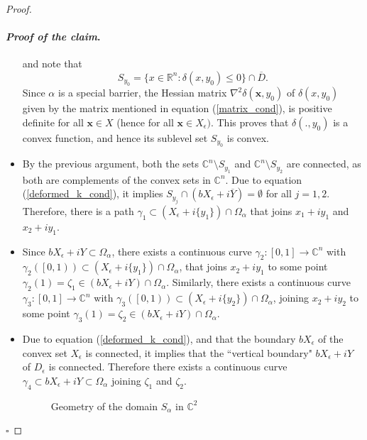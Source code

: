 \documentclass[12pt,reqno, a4paper]{amsart}
\theoremstyle{definition}
\newenvironment{claimproof}{\paragraph{\textit{Proof of the claim}.}}{\hfill$\square$}
\theoremstyle{definition}
\numberwithin{equation}{section}
\def\R{\mathbb{R}}                              %
\def\C{\mathbb{C}}                              %
\def\eps{\epsilon}
\begin{document}
\begin{proof}
\begin{claimproof}
\begin{itemize}
and note that $$S_{y_0}=\{x\in \R^n: \delta(x,y_0)\leq0\}\cap \overline{D}.$$
Since $\alpha $ is a special barrier, the Hessian matrix $\nabla^2\delta(\textbf{x},y_0)$ of $\delta(x,y_0)$ given by the matrix mentioned in equation (\ref{matrix_cond}), is positive definite for all $\textbf{x} \in X$ (hence for all $\textbf{x}\in X_{\eps}).$  This proves that $\delta(.,y_0)$ is a convex function, and hence its sublevel set $S_{y_0}$ is convex.\\
	
\item[(ii)]  By the previous argument, both the sets $\C^n\setminus S_{y_1}$ and $\C^n\setminus S_{y_2}$ are connected, as both are complements of the convex sets in $\C^n$. Due to equation (\ref{deformed_k_cond}), it implies $S_{y_j}\cap (bX_{\epsilon}+i\overline{Y})=\emptyset$ for all $j=1,2.$  Therefore, there is a path $\gamma_{1}\subset (X_{\eps}+i\{y_1\})\cap \Omega_{\alpha}$ that joins $x_1+iy_1$ and $x_2+iy_1$. \\


\item[(iii)] Since $bX_{\eps}+iY\subset \Omega_{\alpha}$, there exists a continuous curve $\gamma_{2}:[0,1]\to \C^n$ with $\gamma_{2}(\left[0,1\right))\subset ({X_{\eps}}+i\{y_1\})\cap \Omega_{\alpha}$, that joins $x_2+iy_1$ to some point $\gamma_{2}(1)=\zeta_1\in (bX_{\epsilon}+iY)\cap {\Omega_{\alpha}}$. Similarly, there exists a continuous curve $\gamma_{3}:[0,1]\to \C^n$ with $\gamma_{3}(\left[0,1\right))\subset ({X_{\eps}}+i\{y_2\})\cap \Omega_{\alpha}$, joining $x_2+iy_2$ to some point $\gamma_{3}(1)=\zeta_2\in (bX_{\epsilon}+iY)\cap {\Omega_{\alpha}}$.\\

\item [(iv)] Due to equation (\ref{deformed_k_cond}), and that the boundary $bX_{\eps}$ of the convex set $X_{\eps}$ is connected, it implies that the ``{vertical boundary}" $bX_{\epsilon}+iY$ of $D_{\epsilon}$ is connected. Therefore there exists a continuous curve $\gamma_{4}\subset bX_{\epsilon}+iY \subset \Omega_{\alpha}$ joining $\zeta_1$ and $\zeta_2.$


\begin{figure}[!htb]
	\centering
	\vspace*{-5.1cm}
	\def\svgwidth{\linewidth}
	\fontsize{12pt}{1em}
	\scalebox{.9}{}
	\vspace*{-6.0cm}
	\caption{Geometry of the domain $S_{\alpha}$ in $\C^2$}
	\label{Salpha}
\end{figure}
\end{itemize}


\end{claimproof}
\end{proof}
\end{document}
